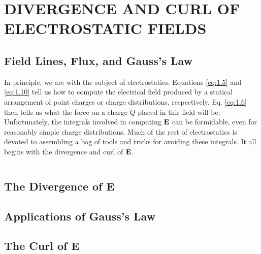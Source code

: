 \chapter{DIVERGENCE AND CURL OF ELECTROSTATIC FIELDS}\label{ch:2}

\section{Field Lines, Flux, and Gauss's Law}\label{sec:2.1} 
In principle, we are  with the subject of electrostatics. Equations \ref{eq:1.5} and \ref{eq:1.10} tell us how to compute the electrical field produced by a statical arrangement of point charges or charge distributions, respectively. Eq. \ref{eq:1.6} then tells us what the force on a charge $Q$ placed in this field will be. Unfortunately, the integrals involved in computing $\vb{E}$ can be formidable, even for reasonably simple charge distributions. Much of the rest of electrostatics is devoted to assembling a bag of tools and tricks for avoiding these integrals. It all begins with the divergence and curl of $\vb{E}$.

\begin{equation}\label{eq:B.11}
\end{equation}


\section{The Divergence of E}\label{sec:2.2}


\section{Applications of Gauss's Law}\label{sec:2.3}


\section{The Curl of E}\label{sec:2.4}

 
